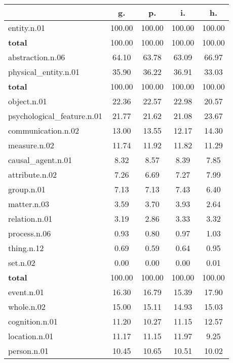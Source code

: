 \begin{table}[h!]
\begin{center}
\begin{tabular}{| l || c | c | c | c |}\hline
 & {\bf g.} & {\bf p.} & {\bf i.} & {\bf h.} \\\hline\hline
entity.n.01 & 100.00  & 100.00  & 100.00  & 100.00 \\\hline\hline
{{\bf total}} & 100.00  & 100.00  & 100.00  & 100.00 \\\hline\hline\hline
abstraction.n.06 & 64.10  & 63.78  & 63.09  & 66.97 \\\hline
physical\_entity.n.01 & 35.90  & 36.22  & 36.91  & 33.03 \\\hline\hline
{{\bf total}} & 100.00  & 100.00  & 100.00  & 100.00 \\\hline\hline\hline
object.n.01 & 22.36  & 22.57  & 22.98  & 20.57 \\\hline
psychological\_feature.n.01 & 21.77  & 21.62  & 21.08  & 23.67 \\\hline
communication.n.02 & 13.00  & 13.55  & 12.17  & 14.30 \\\hline
measure.n.02 & 11.74  & 11.92  & 11.82  & 11.29 \\\hline
causal\_agent.n.01 & 8.32  & 8.57  & 8.39  & 7.85 \\\hline
attribute.n.02 & 7.26  & 6.69  & 7.27  & 7.99 \\\hline
group.n.01 & 7.13  & 7.13  & 7.43  & 6.40 \\\hline
matter.n.03 & 3.59  & 3.70  & 3.93  & 2.64 \\\hline
relation.n.01 & 3.19  & 2.86  & 3.33  & 3.32 \\\hline
process.n.06 & 0.93  & 0.80  & 0.97  & 1.03 \\\hline
thing.n.12 & 0.69  & 0.59  & 0.64  & 0.95 \\\hline
set.n.02 & 0.00  & 0.00  & 0.00  & 0.01 \\\hline\hline
{{\bf total}} & 100.00  & 100.00  & 100.00  & 100.00 \\\hline\hline\hline
event.n.01 & 16.30  & 16.79  & 15.39  & 17.90 \\\hline
whole.n.02 & 15.00  & 15.11  & 14.93  & 15.03 \\\hline
cognition.n.01 & 11.20  & 10.27  & 11.15  & 12.57 \\\hline
location.n.01 & 11.17  & 11.15  & 11.97  & 9.25 \\\hline
person.n.01 & 10.45  & 10.65  & 10.51  & 10.02 \\\hline

\end{tabular}
\end{center}
\end{table}
